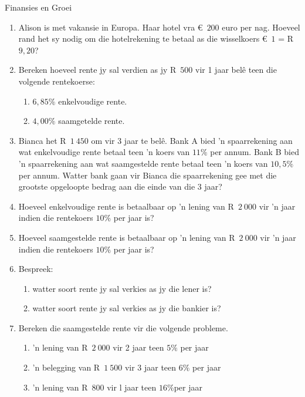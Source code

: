 \begin{eocexercises}{Finansies en Groei}
    \begin{enumerate}[label=\textbf{\arabic*}.]
	\item Alison is met vakansie in Europa. Haar hotel vra €~$200$ euro per nag. Hoeveel rand het sy nodig om die hotelrekening te betaal as die wisselkoers  €~$1$ = R~$9,20$?

	\item Bereken hoeveel rente jy sal verdien as jy R~$500$ vir 1 jaar belê teen die volgende rentekoerse:
	\begin{enumerate}
	    \item $6,85\%$ enkelvoudige rente.
	    \item $4,00\%$ saamgetelde rente.
	\end{enumerate}

	\item Bianca het R~$1~450$ om vir 3 jaar te belê. Bank A bied ’n spaarrekening aan wat enkelvoudige rente betaal
teen ’n koers van $11\%$ per annum. Bank B bied ’n spaarrekening aan wat saamgestelde rente betaal
teen ’n koers van $10,5\%$ per annum. Watter bank gaan vir Bianca die spaarrekening gee met die grootste
opgeloopte bedrag aan die einde van die 3 jaar?

	\item Hoeveel enkelvoudige rente is betaalbaar op ’n lening van R~$2~000$ vir ’n jaar indien die rentekoers $10\%$ per jaar is?

	\item Hoeveel saamgestelde rente is betaalbaar op ’n lening van  R~$2~000$ vir ’n jaar indien die rentekoers $10\%$ per jaar is?

	\item Bespreek:
	\begin{enumerate}
	    \item watter soort rente jy sal verkies as jy die lener is?

	    \item watter soort rente jy sal verkies as jy die bankier is?
	\end{enumerate}

	\item Bereken die saamgestelde rente vir die volgende probleme.
	\begin{enumerate}
	    \item ’n lening van R~$2~000$ vir 2 jaar teen  $5\%$ per jaar
	    \item ’n belegging van  R~$1~500$ vir 3 jaar teen $6\%$ per jaar
	    \item ’n lening van R~$800$ vir l jaar teen $16\%$per jaar
	\end{enumerate}


\end{enumerate}
\end{eocexercises}
